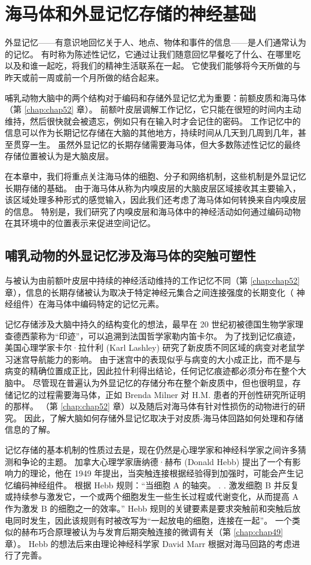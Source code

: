 \chapter{海马体和外显记忆存储的神经基础} \label{chap:chap54}

外显记忆——有意识地回忆关于人、地点、物体和事件的信息——是人们通常认为的记忆。
有时称为陈述性记忆，它通过让我们随意回忆早餐吃了什么、在哪里吃以及和谁一起吃，将我们的精神生活联系在一起。
它使我们能够将今天所做的与昨天或前一周或前一个月所做的结合起来。


哺乳动物大脑中的两个结构对于编码和存储外显记忆尤为重要：前额皮质和海马体（第 \ref{chap:chap52} 章）。
前额叶皮层调解工作记忆，它只能在很短的时间内主动维持，然后很快就会被遗忘，例如只有在输入时才会记住的密码。
工作记忆中的信息可以作为长期记忆存储在大脑的其他地方，持续时间从几天到几周到几年，甚至贯穿一生。
虽然外显记忆的长期存储需要海马体，但大多数陈述性记忆的最终存储位置被认为是大脑皮层。


在本章中，我们将重点关注海马体的细胞、分子和网络机制，这些机制是外显记忆长期存储的基础。
由于海马体从称为内嗅皮层的大脑皮层区域接收其主要输入，该区域处理多种形式的感觉输入，因此我们还考虑了海马体如何转换来自内嗅皮层的信息。
特别是，我们研究了内嗅皮层和海马体中的神经活动如何通过编码动物在其环境中的位置表示来促进空间记忆。



\section{哺乳动物的外显记忆涉及海马体的突触可塑性}

与被认为由前额叶皮层中持续的神经活动维持的工作记忆不同（第 \ref{chap:chap52} 章），信息的长期存储被认为取决于特定神经元集合之间连接强度的长期变化（ 神经组件）在海马体中编码特定的记忆元素。


记忆存储涉及大脑中持久的结构变化的想法，最早在 20 世纪初被德国生物学家理查德西蒙称为“印迹”，可以追溯到法国哲学家勒内笛卡尔。
为了找到记忆痕迹，美国心理学家卡尔·拉什利 (Karl Lashley) 研究了新皮质不同区域的病变对老鼠学习迷宫导航能力的影响。
由于迷宫中的表现似乎与病变的大小成正比，而不是与病变的精确位置成正比，因此拉什利得出结论，任何记忆痕迹都必须分布在整个大脑中。
尽管现在普遍认为外显记忆的存储分布在整个新皮质中，但也很明显，存储记忆的过程需要海马体，正如 Brenda Milner 对 H.M. 患者的开创性研究所证明的那样。
（第 \ref{chap:chap52} 章）以及随后对海马体有针对性损伤的动物进行的研究。
因此，了解大脑如何存储外显记忆取决于对皮质-海马体回路如何处理和存储信息的了解。


记忆存储的基本机制的性质过去是，现在仍然是心理学家和神经科学家之间许多猜测和争论的主题。
加拿大心理学家唐纳德·赫布 (Donald Hebb) 提出了一个有影响力的理论，他在 1949 年提出，当突触连接根据经验得到加强时，可能会产生记忆编码神经组件。 根据 Hebb 规则：“当细胞 A 的轴突。 . . 激发细胞 B 并反复或持续参与激发它，一个或两个细胞发生一些生长过程或代谢变化，从而提高 A 作为激发 B 的细胞之一的效率。” 
Hebb 规则的关键要素是要求突触前和突触后放电同时发生，因此该规则有时被改写为“一起放电的细胞，连接在一起”。
一个类似的赫布巧合原理被认为与发育后期突触连接的微调有关（第 \ref{chap:chap49} 章）。
Hebb 的想法后来由理论神经科学家 David Marr 根据对海马回路的考虑进行了完善。


